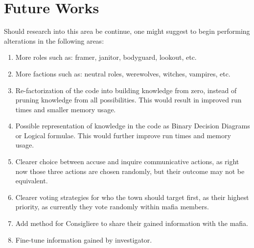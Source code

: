 \section{Future Works}\label{sec:future-works}
Should research into this area be continue, one might suggest to begin
performing alterations in the following areas:
\begin{enumerate}
	\item More roles such as: framer, janitor, bodyguard, lookout, etc.
	\item More factions such as: neutral roles, werewolves, witches, vampires, etc.
	\item Re-factorization of the code into building knowledge from zero, instead of
	      pruning knowledge from all possibilities. This would result in improved run
	      times and smaller memory usage.
	\item Possible representation of knowledge in the code as Binary Decision Diagrams or
	      Logical formulae. This would further improve run times and 
	      memory usage.
	\item Clearer choice between accuse and inquire communicative 
	actions, as right now those three actions are chosen randomly, but 
	their outcome may not be equivalent. 
	\item Clearer voting strategies for who the town should target 
	first, as their highest priority, as currently they vote randomly 
	within mafia members.
	\item Add method for Consigliere to share their gained information 
	with the mafia. 
	\item Fine-tune information gained by investigator.
\end{enumerate}